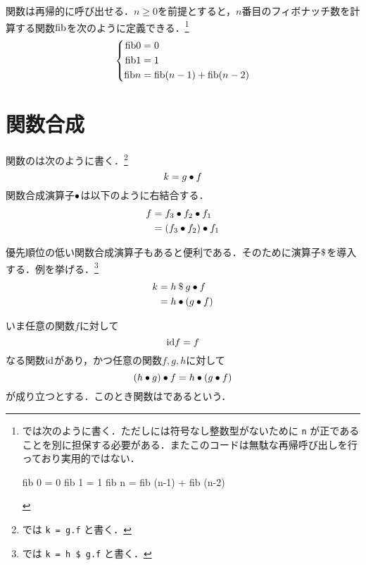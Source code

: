 \documentclass[platex,a5paper,twoside,fleqn,draft]{jsbook}
\newcommand{\keyword}[1]{\textgt{#1}}
\begin{document}
関数は再帰的に呼び出せる．$n\ge0$を前提とすると，$n$番目のフィボナッチ数を計算する関数$\mathord{\mathrm{fib}}$を次のように定義できる．\footnote{\haskell では次のように書く．ただし\haskell には符号なし整数型がないために \verb|n| が正であることを別に担保する必要がある．またこのコードは無駄な再帰呼び出しを行っており実用的ではない．
\begin{footcode}
      fib 0 = 0
      fib 1 = 1
      fib n = fib (n-1) + fib (n-2)
\end{footcode}}
\begin{equation}
\left\{
\begin{aligned}
\mathord{\mathrm{fib}} 0&=0\\
\mathord{\mathrm{fib}} 1&=1\\
\mathord{\mathrm{fib}} n&=\mathord{\mathrm{fib}}(n-1)+\mathord{\mathrm{fib}}(n-2)
\end{aligned}
\right.
\end{equation}

\section{関数合成}

関数の\keyword{合成}は次のように書く．\footnote{\haskell では \verb|k = g.f| と書く．}
\begin{equation}
k=g\mathbin{\bullet} f
\end{equation}
関数合成演算子$\mathbin{\bullet}$は以下のように右結合する．
\begin{align}
f&=f_3\mathbin{\bullet} f_2\mathbin{\bullet} f_1\\
&=\left(f_3\mathbin{\bullet} f_2\right)\mathbin{\bullet} f_1\\
\end{align}

優先順位の低い関数合成演算子もあると便利である．そのために演算子$\mathbin{\$}$を導入する．例を挙げる．\footnote{\haskell では \verb|k = h $ g.f| と書く．}
\begin{align}
k&=h\mathbin{\$} g\mathbin{\bullet} f\\
&=h\mathbin{\bullet}\left(g\mathbin{\bullet} f\right)
\end{align}

いま任意の関数$f$に対して
\begin{equation}
\mathord{\mathrm{id}} f=f
\end{equation}
なる関数$\mathord{\mathrm{id}}$があり，かつ任意の関数$f,g,h$に対して
\begin{equation}
(h\mathbin{\bullet} g)\mathbin{\bullet} f=h\mathbin{\bullet}(g\mathbin{\bullet} f)
\end{equation}
が成り立つとする．このとき関数は\keyword{モノイド}であるという．
\end{document}
